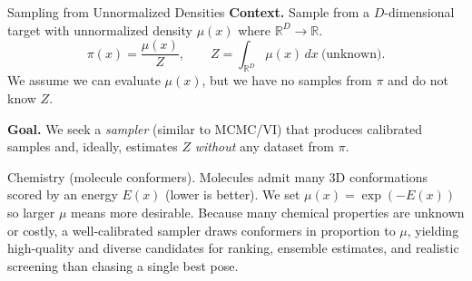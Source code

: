 \documentclass[aspectratio=169,xcolor=dvipsnames]{beamer}
\begin{document}
\begin{frame}[t]{Sampling from Unnormalized Densities}
\footnotesize
\textbf{Context.} Sample from a $D$-dimensional target with unnormalized density $\mu(x)$ where $\mathbb R^D \to \mathbb R$.
\[
\pi(x)=\frac{\mu(x)}{Z},\qquad Z=\int_{\mathbb R^D}\mu(x)\,dx\ \text{(unknown)}.
\]
We assume we can evaluate $\mu(x)$, but we have no samples from $\pi$ and do not know $Z$.

\vspace{0.1cm}

\medskip
\textbf{Goal.} We seek a \emph{sampler} (similar to MCMC/VI) that produces calibrated samples and, ideally, estimates $Z$ \emph{without} any dataset from $\pi$.

\vspace{0.3cm}

\begin{block}{\scriptsize Chemistry (molecule conformers).} \scriptsize 
    Molecules admit many 3D conformations scored by an energy $E(x)$ (lower is better). We set $\mu(x)=\exp(-E(x))$ so larger $\mu$ means more desirable. Because many chemical properties are unknown or costly, a well-calibrated sampler draws conformers in proportion to $\mu$, yielding high-quality and diverse candidates for ranking, ensemble estimates, and realistic screening than chasing a single best pose.

\end{block}

\end{frame}
\end{document}
